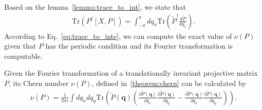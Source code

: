 Based on the lemma~\ref{lemma:trace_to_int}, we state that
\begin{align}
    \text{Tr}(P^\dagger [X,P]) = \int_{-\pi}^{\pi}dq_x \text{Tr}\left(\tilde P^\dagger \frac{d \tilde P}{dq_x}\right).\label{eq:trace_to_inte}
\end{align}
According to Eq.~\ref{eq:trace_to_inte}, we can compute the exact value of $\nu(P)$ given that $P$ has the periodic condition and its Fourier transformation is computable.
\begin{lemma}\label{lemma:Chern_numb_cal}
    Given the Fourier transformation of a translationally invariant projective matrix $P$, its Chern number $\nu(P)$, defined in~\ref{theorem:chern} can be calculated by
    \begin{align}
        \nu(P) = \frac{1}{2\pi i} \int dq_xdq_y \text{Tr}\left(\tilde P(\mathbf{q})\left(\frac{\partial\tilde P(\mathbf{q})}{\partial q_x}\frac{\partial\tilde P(\mathbf{q})}{\partial q_y}-\frac{\partial\tilde P(\mathbf{q})}{\partial q_x}\frac{\partial\tilde P(\mathbf{q})}{\partial q_y}\right)\right).
    \end{align}
\end{lemma}
